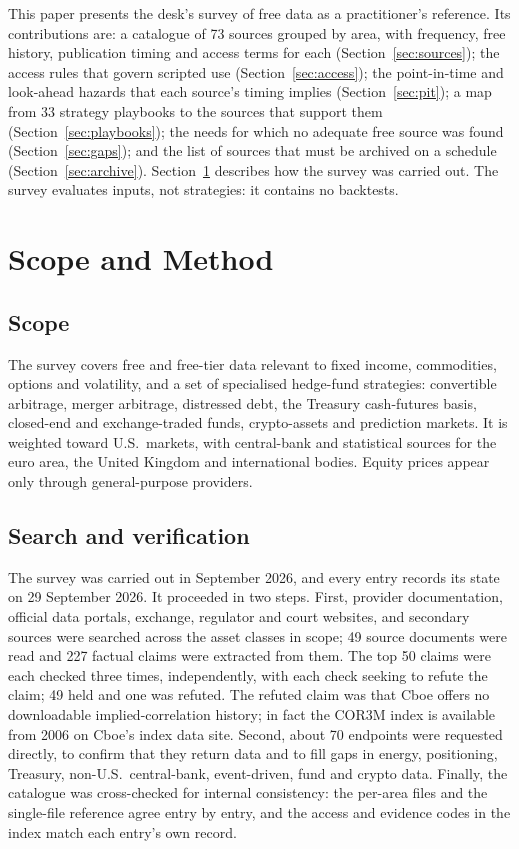 \documentclass[10pt, a4paper, twocolumn]{article}
\begin{document}
This paper presents the desk's survey of free data as a practitioner's reference. Its contributions are: a catalogue of 73 sources grouped by area, with frequency, free history, publication timing and access terms for each (Section~\ref{sec:sources}); the access rules that govern scripted use (Section~\ref{sec:access}); the point-in-time and look-ahead hazards that each source's timing implies (Section~\ref{sec:pit}); a map from 33 strategy playbooks to the sources that support them (Section~\ref{sec:playbooks}); the needs for which no adequate free source was found (Section~\ref{sec:gaps}); and the list of sources that must be archived on a schedule (Section~\ref{sec:archive}). Section~\ref{sec:method} describes how the survey was carried out. The survey evaluates inputs, not strategies: it contains no backtests.

\section{Scope and Method}
\label{sec:method}

\subsection{Scope}

The survey covers free and free-tier data relevant to fixed income, commodities, options and volatility, and a set of specialised hedge-fund strategies: convertible arbitrage, merger arbitrage, distressed debt, the Treasury cash-futures basis, closed-end and exchange-traded funds, crypto-assets and prediction markets. It is weighted toward U.S.\ markets, with central-bank and statistical sources for the euro area, the United Kingdom and international bodies. Equity prices appear only through general-purpose providers.

\subsection{Search and verification}

The survey was carried out in September 2026, and every entry records its state on 29 September 2026. It proceeded in two steps. First, provider documentation, official data portals, exchange, regulator and court websites, and secondary sources were searched across the asset classes in scope; 49 source documents were read and 227 factual claims were extracted from them. The top 50 claims were each checked three times, independently, with each check seeking to refute the claim; 49 held and one was refuted. The refuted claim was that Cboe offers no downloadable implied-correlation history; in fact the COR3M index is available from 2006 on Cboe's index data site. Second, about 70 endpoints were requested directly, to confirm that they return data and to fill gaps in energy, positioning, Treasury, non-U.S.\ central-bank, event-driven, fund and crypto data. Finally, the catalogue was cross-checked for internal consistency: the per-area files and the single-file reference agree entry by entry, and the access and evidence codes in the index match each entry's own record.
\end{document}
